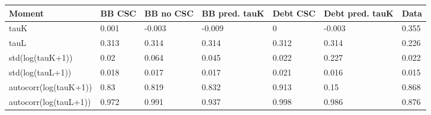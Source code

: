 \begin{tabular}{lllllll}
Moment & BB CSC & BB no CSC & BB pred. tauK & Debt CSC & Debt pred. tauK & Data \\ 
\hline 
tauK & 0.001 & -0.003 & -0.009 & 0 & -0.003 & 0.355 \\ 
tauL & 0.313 & 0.314 & 0.314 & 0.312 & 0.314 & 0.226 \\ 
std(log(tauK+1)) & 0.02 & 0.064 & 0.045 & 0.022 & 0.227 & 0.022 \\ 
std(log(tauL+1)) & 0.018 & 0.017 & 0.017 & 0.021 & 0.016 & 0.015 \\ 
autocorr(log(tauK+1)) & 0.83 & 0.819 & 0.832 & 0.913 & 0.15 & 0.868 \\ 
autocorr(log(tauL+1)) & 0.972 & 0.991 & 0.937 & 0.998 & 0.986 & 0.876 \\ 
\hline 
\end{tabular}
